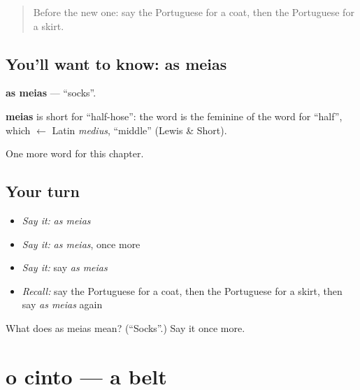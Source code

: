 \label{lesson:PT-C78-meias}



\begin{quote}
Before the new one: say the Portuguese for a coat, then the Portuguese for a skirt.
\end{quote}

\subsection*{You'll want to know: as meias}
\textbf{as meias} — \textquotedblleft{}socks\textquotedblright{}.

\begin{cousinweb}
\textbf{meias} is short for \textquotedblleft{}half-hose\textquotedblright{}: the word is the feminine of the word for \textquotedblleft{}half\textquotedblright{}, which $\leftarrow$ Latin \emph{medius}, \textquotedblleft{}middle\textquotedblright{} (Lewis \& Short).
\end{cousinweb}

\begin{grammarlens}[title={What you've built}]
One more word for this chapter.
\end{grammarlens}

\subsection*{Your turn}
\begin{itemize}
\raggedright
  \item \emph{Say it:} \emph{as meias}
  \item \emph{Say it:} \emph{as meias}, once more
  \item \emph{Say it:} say \emph{as meias}
  \item \emph{Recall:} say the Portuguese for a coat, then the Portuguese for a skirt, then say \emph{as meias} again
\end{itemize}

\begin{tcolorbox}[breakable,colback=teal!4,colframe=teal!35!black,title={Before you move on}]
What does as meias mean? (\textquotedblleft{}Socks\textquotedblright{}.) Say it once more.
\end{tcolorbox}
\section[o cinto]{o cinto — a belt}

\label{lesson:PT-C78-cinto}



